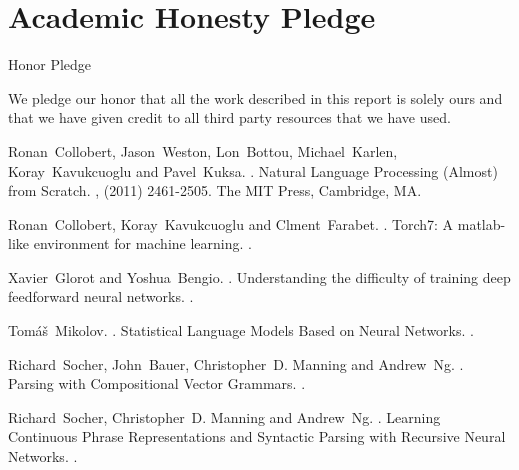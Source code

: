 \documentclass[11pt]{article}
\begin{document}
\section{Academic Honesty Pledge}

Honor Pledge

We pledge our honor that all the work described in this report is solely ours and
that we have given credit to all third party resources that we have used.

%
%

\begin{thebibliography}{}

Ronan~Collobert, Jason~Weston, Lon~Bottou, Michael~Karlen, Koray~Kavukcuoglu and Pavel~Kuksa.
.
\newblock Natural Language Processing (Almost) from Scratch.
,  (2011) 2461-2505.
\newblock The MIT Press, Cambridge, MA.

Ronan~Collobert, Koray~Kavukcuoglu and Clment~Farabet.
.
\newblock Torch7: A matlab-like environment for machine learning.
.

Xavier~Glorot and Yoshua~Bengio.
.
\newblock Understanding the difficulty of training deep feedforward neural networks.
.

Tomáš~Mikolov.
.
\newblock Statistical Language Models Based on Neural Networks.
.

Richard~Socher, John~Bauer, Christopher~D. Manning and Andrew~Ng.
.
\newblock Parsing with Compositional Vector Grammars.
.

Richard~Socher, Christopher~D. Manning and Andrew~Ng.
.
\newblock Learning Continuous Phrase Representations and
Syntactic Parsing with Recursive Neural Networks.
.

\end{thebibliography}
\end{document}

